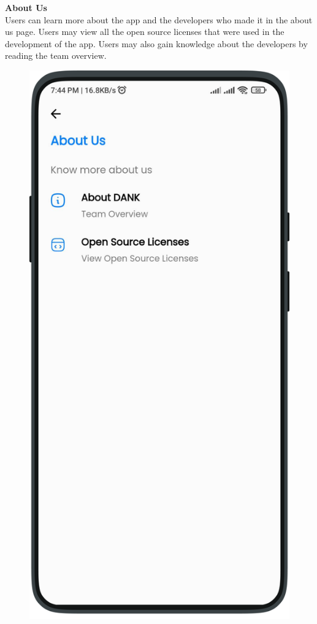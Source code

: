         \textbf{About Us}\\
         Users can learn more about the app and the developers who made it in the about us page. Users may view all the open source licenses that were used in the development of the app. Users may also gain knowledge about the developers by reading the team overview.
         \newpage
         \begin{multicols}{3}
            \begin{figure}[H]
            \centering
            \includegraphics[width=0.85\linewidth]{images/results/mobile/AboutUs.png}

\end{figure}
\end{multicols}
